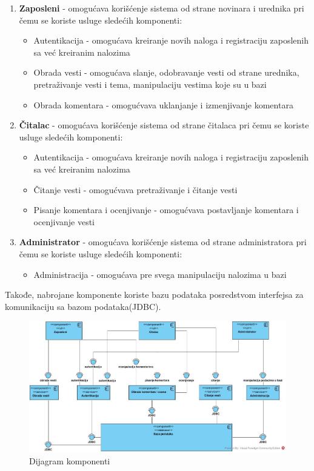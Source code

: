 \documentclass{article}
\begin{document}
\begin{enumerate}
    \item \textbf{Zaposleni} - omogućava korišćenje sistema od strane novinara i urednika pri čemu se koriste usluge sledećih komponenti:
        \begin{itemize}
            \item Autentikacija - omogućava kreiranje novih naloga i registraciju zaposlenih sa već kreiranim nalozima
            \item Obrada vesti - omogućava slanje, odobravanje vesti od strane urednika, pretraživanje vesti i tema, manipulaciju vestima koje su u bazi
            \item Obrada komentara - omogućvava uklanjanje i izmenjivanje komentara
        \end{itemize}
    \item \textbf{Čitalac} - omogućava korišćenje sistema od strane čitalaca pri čemu se koriste usluge sledećih komponenti:
        \begin{itemize}
            \item Autentikacija - omogućava kreiranje novih naloga i registraciju zaposlenih sa već kreiranim nalozima
            \item Čitanje vesti - omogućvava pretraživanje i čitanje vesti
            \item Pisanje komentara i ocenjivanje - omogućvava postavljanje komentara i ocenjivanje vesti
        \end{itemize}
    \item \textbf{Administrator} - omogućava korišćenje sistema od strane administratora pri čemu se koriste usluge sledećih komponenti:
        \begin{itemize}
            \item Administracija - omogućava pre svega manipulaciju nalozima u bazi
        \end{itemize}
\end{enumerate}

Takođe, nabrojane komponente koriste bazu podataka posredstvom interfejsa za komunikaciju sa bazom podataka(JDBC).  

\begin{figure}[htbp!]
    \centering
    \includegraphics[scale=0.4]{Dijagram_komponenti.jpg}
    \caption{Dijagram komponenti}
    \label{slk:dtp}
\end{figure}
\end{document}
